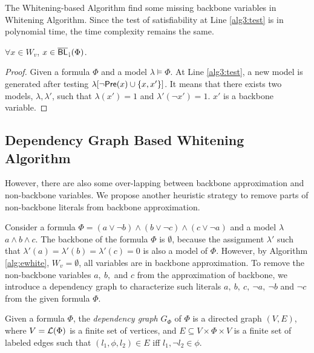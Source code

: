 The Whitening-based Algorithm find some missing backbone variables in Whitening Algorithm. Since the test of satisfiability at Line \ref{alg3:test} is in polynomial time, the time complexity remains the same.

\begin{theorem}
$\forall x\in W_v$, $x\in{\sf \overline{BL}_\downharpoonright}(\Phi)$.
\end{theorem}

\begin{proof}
Given a formula $\Phi$ and a model $\lambda\models\Phi$. At Line \ref{alg3:test}, a new model is generated after testing $\lambda[\neg \textsf{Pre}(x)\cup \{x,x'\}]$. It means that there exists two models, $\lambda,\lambda'$, such that $\lambda(x')=1$ and $\lambda'(\neg x')=1$. $x'$ is a backbone variable.
\end{proof}
\medskip


\iffalse
\subsection{Dependency Graph Based Whitening Algorithm}

However, there are also some over-lapping between backbone approximation and non-backbone variables. We propose another heuristic strategy to remove parts of non-backbone literals from backbone approximation.

Consider a formula $\Phi=(a\vee\neg b)\wedge(b\vee\neg c)\wedge(c\vee\neg a)$ and a model $\lambda$ $a\wedge b\wedge c$. The backbone of the formula $\Phi$ is $\emptyset$, because the assignment $\lambda'$ such that $\lambda'(a)=\lambda'(b)=\lambda'(c)=0$ is also a model of $\Phi$.
However, by Algorithm \ref{alg:ewhite}, $W_v=\emptyset$, all variables are in backbone approximation. To remove the non-backbone variables $a, \ b, $ and $c$ from the approximation of backbone, we introduce a dependency graph to characterize such literals $a, \ b, \ c, \ \neg a, \ \neg b$ and  $\neg c$ from  the given formula $\Phi$.

Given a formula $\Phi$, the \emph{dependency graph} $G_\Phi$ of $\Phi$ is a directed graph $(V,E)$, where
$V=\Lit(\Phi)$ is a finite set of vertices, and $E\subseteq V\times \Phi\times V$ is a finite set of labeled edges such that
$(l_1,\phi, l_2)\in E$ iff $l_1,\neg l_2\in \phi$.

